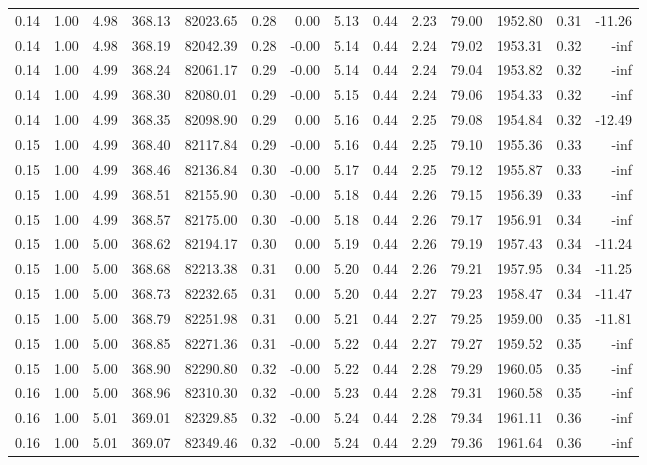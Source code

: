 \begin{table}[!ht]
\begin{tabular}{rrrrrrrrrrrrrr}
0.14 & 1.00 & 4.98 & 368.13 & 82023.65 & 0.28 & 0.00 & 5.13 & 0.44 & 2.23 & 79.00 & 1952.80 & 0.31 & -11.26 \\
0.14 & 1.00 & 4.98 & 368.19 & 82042.39 & 0.28 & -0.00 & 5.14 & 0.44 & 2.24 & 79.02 & 1953.31 & 0.32 & -inf \\
0.14 & 1.00 & 4.99 & 368.24 & 82061.17 & 0.29 & -0.00 & 5.14 & 0.44 & 2.24 & 79.04 & 1953.82 & 0.32 & -inf \\
0.14 & 1.00 & 4.99 & 368.30 & 82080.01 & 0.29 & -0.00 & 5.15 & 0.44 & 2.24 & 79.06 & 1954.33 & 0.32 & -inf \\
0.14 & 1.00 & 4.99 & 368.35 & 82098.90 & 0.29 & 0.00 & 5.16 & 0.44 & 2.25 & 79.08 & 1954.84 & 0.32 & -12.49 \\
0.15 & 1.00 & 4.99 & 368.40 & 82117.84 & 0.29 & -0.00 & 5.16 & 0.44 & 2.25 & 79.10 & 1955.36 & 0.33 & -inf \\
0.15 & 1.00 & 4.99 & 368.46 & 82136.84 & 0.30 & -0.00 & 5.17 & 0.44 & 2.25 & 79.12 & 1955.87 & 0.33 & -inf \\
0.15 & 1.00 & 4.99 & 368.51 & 82155.90 & 0.30 & -0.00 & 5.18 & 0.44 & 2.26 & 79.15 & 1956.39 & 0.33 & -inf \\
0.15 & 1.00 & 4.99 & 368.57 & 82175.00 & 0.30 & -0.00 & 5.18 & 0.44 & 2.26 & 79.17 & 1956.91 & 0.34 & -inf \\
0.15 & 1.00 & 5.00 & 368.62 & 82194.17 & 0.30 & 0.00 & 5.19 & 0.44 & 2.26 & 79.19 & 1957.43 & 0.34 & -11.24 \\
0.15 & 1.00 & 5.00 & 368.68 & 82213.38 & 0.31 & 0.00 & 5.20 & 0.44 & 2.26 & 79.21 & 1957.95 & 0.34 & -11.25 \\
0.15 & 1.00 & 5.00 & 368.73 & 82232.65 & 0.31 & 0.00 & 5.20 & 0.44 & 2.27 & 79.23 & 1958.47 & 0.34 & -11.47 \\
0.15 & 1.00 & 5.00 & 368.79 & 82251.98 & 0.31 & 0.00 & 5.21 & 0.44 & 2.27 & 79.25 & 1959.00 & 0.35 & -11.81 \\
0.15 & 1.00 & 5.00 & 368.85 & 82271.36 & 0.31 & -0.00 & 5.22 & 0.44 & 2.27 & 79.27 & 1959.52 & 0.35 & -inf \\
0.15 & 1.00 & 5.00 & 368.90 & 82290.80 & 0.32 & -0.00 & 5.22 & 0.44 & 2.28 & 79.29 & 1960.05 & 0.35 & -inf \\
0.16 & 1.00 & 5.00 & 368.96 & 82310.30 & 0.32 & -0.00 & 5.23 & 0.44 & 2.28 & 79.31 & 1960.58 & 0.35 & -inf \\
0.16 & 1.00 & 5.01 & 369.01 & 82329.85 & 0.32 & -0.00 & 5.24 & 0.44 & 2.28 & 79.34 & 1961.11 & 0.36 & -inf \\
0.16 & 1.00 & 5.01 & 369.07 & 82349.46 & 0.32 & -0.00 & 5.24 & 0.44 & 2.29 & 79.36 & 1961.64 & 0.36 & -inf \\

\end{tabular}
\end{table}
